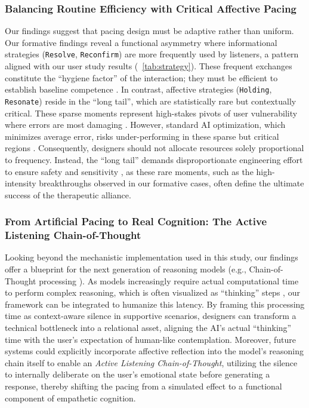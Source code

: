 \subsubsection{Balancing Routine Efficiency with Critical Affective Pacing}
Our findings suggest that pacing design must be adaptive rather than uniform. Our formative findings reveal a functional asymmetry where informational strategies (\texttt{Resolve}, \texttt{Reconfirm}) are more frequently used by listeners, a pattern aligned with our user study results (\tablename{~\ref{tab:strategy}}). These frequent exchanges constitute the ``hygiene factor'' of the interaction; they must be efficient to establish baseline competence \cite{Ayedoun2018Adding}.
In contrast, affective strategies (\texttt{Holding}, \texttt{Resonate}) reside in the ``long tail'', which are statistically rare but contextually critical.
These sparse moments represent high-stakes pivots of user vulnerability where errors are most damaging \cite{Ayedoun2018Adding, VanPinxteren2020Humanlike}. However, standard AI optimization, which minimizes average error, risks under-performing in these sparse but critical regions \cite{Zhang2022Towards}.
Consequently, designers should not allocate resources solely proportional to frequency. Instead, the ``long tail'' demands disproportionate engineering effort to ensure safety and sensitivity \cite{VanPinxteren2020Humanlike}, as these rare moments, such as the high-intensity breakthroughs observed in our formative cases, often define the ultimate success of the therapeutic alliance.


\subsubsection{From Artificial Pacing to Real Cognition: The Active Listening Chain-of-Thought} Looking beyond the mechanistic implementation used in this study, our findings offer a blueprint for the next generation of reasoning models (e.g., Chain-of-Thought processing \cite{wei2022chain}). As models increasingly require actual computational time to perform complex reasoning, which is often visualized as ``thinking'' steps \cite{10.1145/3706599.3719725}, our framework can be integrated to humanize this latency. By framing this processing time as context-aware silence in supportive scenarios, designers can transform a technical bottleneck into a relational asset, aligning the AI's actual ``thinking'' time with the user's expectation of human-like contemplation. Moreover, future systems could explicitly incorporate affective reflection into the model's reasoning chain itself to enable an \emph{Active Listening Chain-of-Thought}, utilizing the silence to internally deliberate on the user's emotional state before generating a response, thereby shifting the pacing from a simulated effect to a functional component of empathetic cognition.

